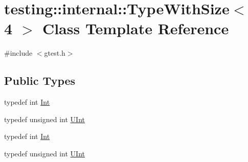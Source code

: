 \hypertarget{classtesting_1_1internal_1_1_type_with_size_3_014_01_4}{\section{testing\-:\-:internal\-:\-:Type\-With\-Size$<$ 4 $>$ Class Template Reference}
\label{classtesting_1_1internal_1_1_type_with_size_3_014_01_4}
}


{\ttfamily \#include $<$gtest.\-h$>$}

\subsection*{Public Types}
\begin{DoxyCompactItemize}
\item 
typedef int \hyperlink{classtesting_1_1internal_1_1_type_with_size_3_014_01_4_a80351860c00ed665e73f952143f4484a}{Int}
\item 
typedef unsigned int \hyperlink{classtesting_1_1internal_1_1_type_with_size_3_014_01_4_a7d559570f830bf35d095eeb94d98de58}{U\-Int}
\item 
typedef int \hyperlink{classtesting_1_1internal_1_1_type_with_size_3_014_01_4_a80351860c00ed665e73f952143f4484a}{Int}
\item 
typedef unsigned int \hyperlink{classtesting_1_1internal_1_1_type_with_size_3_014_01_4_a7d559570f830bf35d095eeb94d98de58}{U\-Int}
\end{DoxyCompactItemize}


